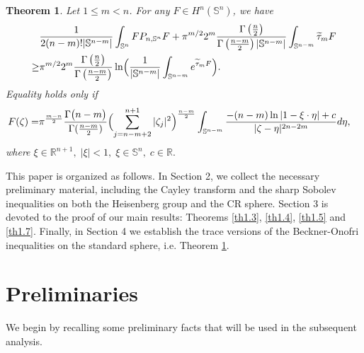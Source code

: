 \documentclass[12pt,reqno]{amsart}%
\newtheorem{theorem}{Theorem}[section]
\theoremstyle{plain}
\numberwithin{equation}{section}
\begin{document}
\begin{theorem}\label{th1.8}
Let \( 1 \leq m < n \). For any \( F \in H^{n}(\mathbb{S}^{n}) \), we have
\begin{align}\nonumber
&\frac{1}{2(n-m)!|\mathbb{S}^{n-m}|} \int_{\mathbb{S}^{n}} F  P_{n,\mathbb{S}^{n}} F
+ \pi^{m/2}  2^{m}  \frac{\Gamma\left(\frac{n}{2}\right)}{\Gamma\left(\frac{n-m}{2}\right)|\mathbb{S}^{n-m}|} \int_{\mathbb{S}^{n-m}} \widetilde{\tau}_{m}F \\
\label{eq:trace-ineq2}
\geq&\pi^{m/2}  2^{m}  \frac{\Gamma\left(\frac{n}{2}\right)}{\Gamma\left(\frac{n-m}{2}\right)}\ln\Bigl( \frac{1}{|\mathbb{S}^{n-m}|} \int_{\mathbb{S}^{n-m}} e^{\widetilde{\tau}_{m}F} \Bigr).
\end{align}
Equality holds only if
\begin{align*}
F(\zeta)=&\pi^{\frac{m-n}{2}}\frac{\Gamma\bigl(n-m\bigr)}{\Gamma(\frac{n-m}{2})}\Bigl(\sum_{j=n-m+2}^{n+1}|\zeta_{j}|^{2}\Bigr)^{\frac{n-m}{2}}
\int_{\mathbb{S}^{n-m}} \frac{- (n-m) \ln| 1 -  \xi\cdot\eta | + c}{|\zeta-\eta|^{2n-2m}}
d\eta,
\end{align*}
where $\xi \in \mathbb{R}^{n+1},\;|\xi|<1,\;  \xi \in \mathbb{S}^{n},\; c \in \mathbb{R}.$
\end{theorem}

This paper is organized as follows. In Section 2, we collect the necessary preliminary material, including the Cayley transform and the sharp Sobolev inequalities on both the Heisenberg group and the CR sphere. Section 3 is devoted to the proof of our main results: Theorems \ref{th1.3}, \ref{th1.4}, \ref{th1.5} and \ref{th1.7}. Finally, in Section 4 we establish the trace versions of the Beckner-Onofri inequalities on the standard sphere, i.e. Theorem \ref{th1.8}.

\section{Preliminaries}
We begin by recalling some preliminary facts that will be used in the subsequent analysis.
\end{document}
